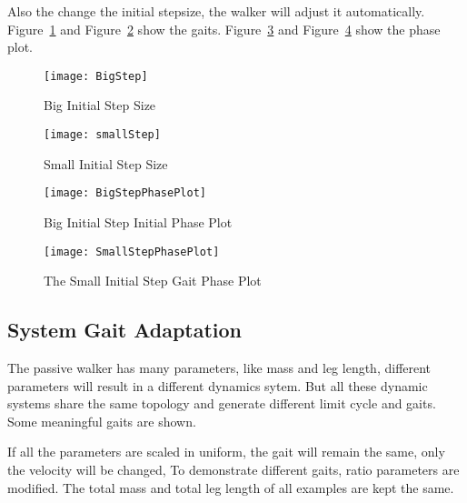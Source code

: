 Also the change the initial stepsize, the walker will adjust it automatically.
Figure~\ref{fig:bigStepIni} and Figure~\ref{fig:smallStepini} show the gaits.
Figure~\ref{fig:bigstepiniGaitPlot} and Figure~\ref{fig:smallstepiniPhasePlot} show the phase plot.

\begin{figure}[!htbp]
  \begin{center}
      \texttt{[image: BigStep]}
    \caption{Big Initial Step Size}
    \label{fig:bigStepIni}
\end{center}
\end{figure}


\begin{figure}[!htbp]
  \begin{center}
      \texttt{[image: smallStep]}
    \caption{Small Initial Step Size}
    \label{fig:smallStepini}
\end{center}
\end{figure}


\begin{figure}[!htbp]
  \begin{center}
      \texttt{[image: BigStepPhasePlot]}
    \caption{Big Initial Step Initial Phase Plot}
    \label{fig:bigstepiniGaitPlot}
\end{center}
\end{figure}


\begin{figure}[!htbp]
  \begin{center}
      \texttt{[image: SmallStepPhasePlot]}
    \caption{The Small Initial Step Gait Phase Plot}
    \label{fig:smallstepiniPhasePlot}
\end{center}
\end{figure}







\subsection{System Gait Adaptation}
The passive walker has many parameters, like mass and leg length, different parameters will result in a different dynamics sytem.
But all these dynamic systems  share the same topology and generate different limit cycle and gaits.
Some meaningful gaits are shown.

If all the parameters are scaled in uniform, the gait will remain the same, only the velocity will be changed,
To demonstrate different gaits, ratio parameters are modified. 
The total mass and total leg length of all examples are kept the same.



